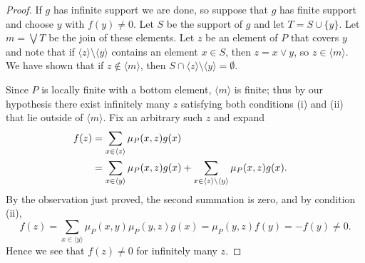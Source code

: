\documentclass[10pt,a4paper]{amsart}
\def\ideal#1{\langle #1\rangle}
\begin{document}
\begin{proof}
If $g$ has infinite support we are done, so suppose that $g$ has finite support
and choose $y$ with $f(y)\ne 0$. Let $S$ be the support of $g$ and let $T = S\cup\{y\}$. Let $m = \bigvee T$
be the join of these elements. Let $z$ be an element of $P$ that covers $y$ and note that if
$\ideal z\setminus \ideal y$ contains an element $x\in S$, then $z = x\vee y$, so $z\in \ideal m$.
We have shown that if $z\notin \ideal m$, then $S\cap \ideal z \setminus \ideal y = \emptyset$.

Since $P$ is locally finite with a bottom element, $\ideal m$ is finite; thus
by our hypothesis there exist infinitely many $z$ satisfying both conditions (i) and (ii)
that lie outside of $\ideal m$. Fix an arbitrary such $z$ and expand
\begin{align*}
f(z) &= \sum_{x \in \ideal z} \mu_P(x,z) g(x) \cr
&= \sum_{x\in \ideal y}\mu_P(x,z)g(x)
+ \sum_{x\in \ideal z \setminus \ideal y} \mu_P(x,z) g(x).\cr
\end{align*}
By the observation just proved, the second summation is zero, and by condition (ii),
$$f(z) = \sum_{x\in \ideal y} \mu_P(x,y)\mu_P(y,z) g(x) = \mu_P(y,z) f(y) = -f(y) \ne 0.$$
Hence we see that $f(z) \ne 0$ for infinitely many $z$.
\end{proof}
\end{document}

